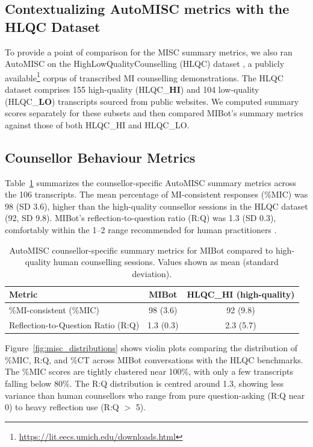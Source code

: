 \subsection{Contextualizing AutoMISC metrics with the HLQC Dataset}
To provide a point of comparison for the MISC summary metrics, we also ran AutoMISC on the HighLowQualityCounselling (HLQC) dataset  \cite{perez-rosas-etal-2019-makes}, a publicly available\footnote{ \url{https://lit.eecs.umich.edu/downloads.html}} corpus of transcribed MI counselling demonstrations. The HLQC dataset comprises 155 high-quality (HLQC\_\textbf{HI}) and 104 low-quality (HLQC\_\textbf{LO}) transcripts sourced from public websites.
We computed summary scores separately for these subsets and then compared MIBot's summary metrics against those of both HLQC\_HI and HLQC\_LO.

\subsection{Counsellor Behaviour Metrics}
Table~\ref{table:automisc_summary} summarizes the counsellor-specific AutoMISC summary metrics across the 106 transcripts. The mean percentage of MI-consistent responses (\%MIC) was 98 (SD 3.6), higher than the high-quality counsellor sessions in the HLQC dataset (92, SD 9.8). MIBot's reflection-to-question ratio (R:Q) was 1.3 (SD 0.3), comfortably within the 1--2 range recommended for human practitioners \cite{moyers2016miti}.

\begin{table}[ht]
  \centering
  \small
  \setlength{\tabcolsep}{4pt}
  \renewcommand{\arraystretch}{1.1}
  \begin{tabular}{@{}lcc@{}}
    \toprule
    \textbf{Metric} & \textbf{MIBot} & \textbf{HLQC\_HI (high-quality)} \\
    \midrule
    \%MI-consistent (\%MIC) & 98 (3.6) & 92 (9.8) \\
    Reflection-to-Question Ratio (R:Q) & 1.3 (0.3) & 2.3 (5.7) \\
    \bottomrule
  \end{tabular}
  \caption{AutoMISC counsellor-specific summary metrics for MIBot compared to high-quality human counselling sessions. Values shown as mean (standard deviation).}
  \label{table:automisc_summary}
\end{table}

Figure~\ref{fig:misc_distributions} shows violin plots comparing the distribution of \%MIC, R:Q, and \%CT across MIBot conversations with the HLQC benchmarks. The \%MIC scores are tightly clustered near 100\%, with only a few transcripts falling below 80\%. The R:Q distribution is centred around 1.3, showing less variance than human counsellors who range from pure question-asking (R:Q near 0) to heavy reflection use (R:Q $>$ 5).

